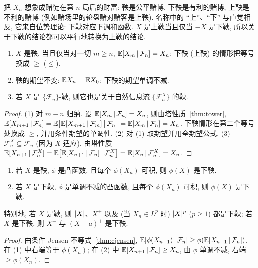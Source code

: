 把 $X_n$ 想象成赌徒在第 $n$ 局后的财富: 鞅是公平赌博, 下鞅是有利的赌博, 上鞅是不利的赌博 (例如赌场里的轮盘赌对赌客是上鞅). 名称中的 ``上''、``下'' 与直觉相反, 它来自位势理论: 下鞅对应下调和函数. $X$ 是上鞅当且仅当 $-X$ 是下鞅, 所以关于下鞅的结论都可以平行地转换为上鞅的结论.

\begin{proposition}\label{prop:martingale-basic}
\begin{enumerate}
\item $X$ 是鞅, 当且仅当对一切 $m\ge n$, $\mathbb{E}[X_m\,|\,\mathcal{F}_n]=X_n$; 下鞅 (上鞅) 的情形把等号换成 $\ge$ ($\le$).
\item 鞅的期望不变: $\mathbb{E} X_n=\mathbb{E} X_0$; 下鞅的期望单调不减.
\item 若 $X$ 是 $\{\mathcal{F}_n\}$-鞅, 则它也是关于自然信息流 $\{\mathcal{F}^X_n\}$ 的鞅.
\end{enumerate}
\end{proposition}

\begin{proof}
(1) 对 $m-n$ 归纳. 设 $\mathbb{E}[X_{m}\,|\,\mathcal{F}_n]=X_n$, 则由塔性质~\ref{thm:tower},
$\mathbb{E}[X_{m+1}\,|\,\mathcal{F}_n]=\mathbb{E}\big[\mathbb{E}[X_{m+1}\,|\,\mathcal{F}_m]\,\big|\,\mathcal{F}_n\big]=\mathbb{E}[X_m\,|\,\mathcal{F}_n]=X_n$. 下鞅情形在第二个等号处换成 $\ge$, 并用条件期望的单调性.
(2) 对 (1) 取期望并用全期望公式.
(3) $\mathcal{F}^X_n\subseteq\mathcal{F}_n$ (因为 $X$ 适应), 由塔性质 $\mathbb{E}[X_{n+1}\,|\,\mathcal{F}^X_n]=\mathbb{E}\big[\mathbb{E}[X_{n+1}\,|\,\mathcal{F}_n]\,\big|\,\mathcal{F}^X_n\big]=\mathbb{E}[X_n\,|\,\mathcal{F}^X_n]=X_n$.
\end{proof}

\begin{proposition}[鞅的凸函数是下鞅]\label{prop:convex-submartingale}
\begin{enumerate}
\item 若 $X$ 是鞅, $\phi$ 是凸函数, 且每个 $\phi(X_n)$ 可积, 则 $\phi(X)$ 是下鞅.
\item 若 $X$ 是下鞅, $\phi$ 是单调不减的凸函数, 且每个 $\phi(X_n)$ 可积, 则 $\phi(X)$ 是下鞅.
\end{enumerate}
特别地, 若 $X$ 是鞅, 则 $\lvert X\rvert$、$X^+$ 以及 (当 $X_n\in L^p$ 时) $\lvert X\rvert^p$ ($p\ge1$) 都是下鞅; 若 $X$ 是下鞅, 则 $X^+$ 与 $(X-a)^+$ 是下鞅.
\end{proposition}

\begin{proof}
由条件 Jensen 不等式~\ref{thm:cjensen}, $\mathbb{E}[\phi(X_{n+1})\,|\,\mathcal{F}_n]\ge\phi(\mathbb{E}[X_{n+1}\,|\,\mathcal{F}_n])$. 在 (1) 中右端等于 $\phi(X_n)$; 在 (2) 中 $\mathbb{E}[X_{n+1}\,|\,\mathcal{F}_n]\ge X_n$, 由 $\phi$ 单调不减, 右端 $\ge\phi(X_n)$.
\end{proof}

